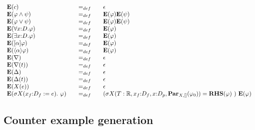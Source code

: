 \documentclass{article}
\begin{document}
\begin{equation*}
\begin{array}{lll}
{\mathbf{E}}(c) & =_{def} & \epsilon \\
{\mathbf{E}}(\varphi \wedge \psi ) & =_{def} & {\mathbf{E}}(\varphi ){%
\mathbf{E}}(\psi ) \\
{\mathbf{E}}(\varphi \vee \psi ) & =_{def} & {\mathbf{E}}(\varphi ){\mathbf{E%
}}(\psi ) \\
{\mathbf{E}}(\forall {x{:}D}.\varphi ) & =_{def} & {\mathbf{E}}(\varphi ) \\
{\mathbf{E}}(\exists {x{:}D}.\varphi ) & =_{def} & {\mathbf{E}}(\varphi ) \\
{\mathbf{E}}([\alpha ]\varphi ) & =_{def} & {\mathbf{E}}(\varphi ) \\
{\mathbf{E}}(\langle \alpha \rangle \varphi ) & =_{def} & {\mathbf{E}}%
(\varphi ) \\
{\mathbf{E}}(\nabla ) & =_{def} & \epsilon \\
{\mathbf{E}}(\nabla (t)) & =_{def} & \epsilon \\
{\mathbf{E}}(\Delta ) & =_{def} & \epsilon \\
{\mathbf{E}}(\Delta (t)) & =_{def} & \epsilon \\
{\mathbf{E}}(X(e)) & =_{def} & \epsilon \\
{\mathbf{E}}(\sigma X(x_{f}{:}D_{f}:=e).~\varphi )~~~ & =_{def}~~~ & (%
\sigma X(T:\mathbb{R},x_{f}{:}D_{f},x{:}D_{p},\mathbf{Par}%
_{X,[]}(\varphi _{0}))={\mathbf{RHS}}(\varphi )~)~{\mathbf{E}}(\varphi )%
\end{array}%
\end{equation*}%

\subsection{Counter example generation}
\end{document}
